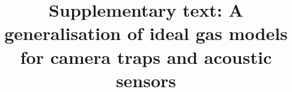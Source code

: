 \documentclass[a4paper,10pt,reqno,oneside]{amsart}
\begin{document}
\title{Supplementary text: A generalisation of ideal gas models for camera traps and acoustic sensors}
\maketitle

\tableofcontents





\clearpage
	
	
\end{document}

